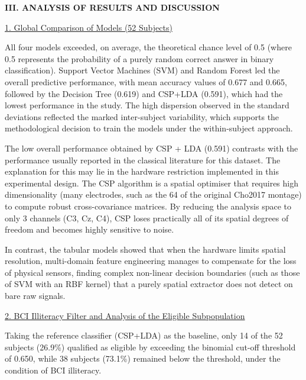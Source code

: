 \documentclass[12pt,a4paper]{article}
\newcommand{\mainsection}[1]{%
  \par\bigskip\noindent\textbf{#1}\par\nopagebreak}
\newcommand{\subheading}[1]{%
  \par\noindent\underline{#1}\par\nopagebreak}
\begin{document}
\mainsection{III. ANALYSIS OF RESULTS AND DISCUSSION}
\subheading{1. Global Comparison of Models (52 Subjects)}
All four models exceeded, on average, the theoretical chance level of 0.5 (where 0.5 represents
the probability of a purely random correct answer in binary classification). Support Vector
Machines (SVM) and Random Forest led the overall predictive performance, with mean accuracy
values of 0.677 and 0.665, followed by the Decision Tree (0.619) and CSP+LDA (0.591), which had
the lowest performance in the study. The high dispersion observed in the standard deviations
reflected the marked inter-subject variability, which supports the methodological decision to
train the models under the within-subject approach.

The low overall performance obtained by CSP + LDA (0.591) contrasts with the performance usually
reported in the classical literature for this dataset. The explanation for this may lie in the
hardware restriction implemented in this experimental design. The CSP algorithm is a spatial
optimiser that requires high dimensionality (many electrodes, such as the 64 of the original
Cho2017 montage) to compute robust cross-covariance matrices. By reducing the analysis space to
only 3 channels (C3, Cz, C4), CSP loses practically all of its spatial degrees of freedom and
becomes highly sensitive to noise.

In contrast, the tabular models showed that when the hardware limits spatial resolution,
multi-domain feature engineering manages to compensate for the loss of physical sensors, finding
complex non-linear decision boundaries (such as those of SVM with an RBF kernel) that a purely
spatial extractor does not detect on bare raw signals.

\medskip
\subheading{2. BCI Illiteracy Filter and Analysis of the Eligible Subpopulation}
Taking the reference classifier (CSP+LDA) as the baseline, only 14 of the 52 subjects (26.9\%)
qualified as eligible by exceeding the binomial cut-off threshold of 0.650, while 38 subjects
(73.1\%) remained below the threshold, under the condition of BCI illiteracy.
\end{document}
